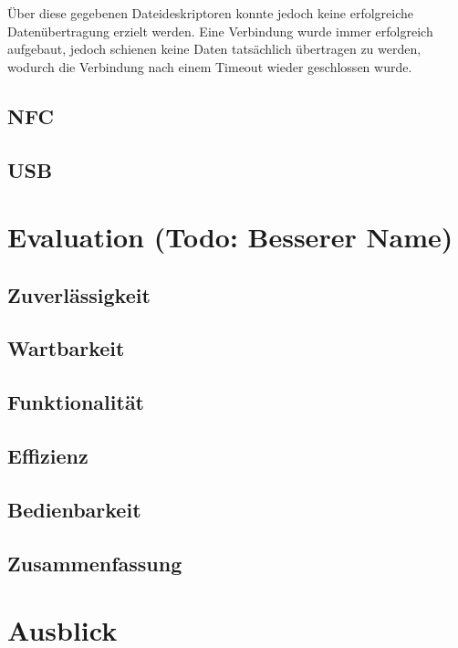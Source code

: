 \documentclass[12pt,a4paper]{article}
\begin{document}
        Über diese gegebenen Dateideskriptoren konnte jedoch keine erfolgreiche Datenübertragung erzielt werden. Eine Verbindung wurde immer erfolgreich aufgebaut, jedoch schienen keine Daten tatsächlich übertragen zu werden, wodurch die Verbindung nach einem Timeout wieder geschlossen wurde.
        
    \subsection{NFC}
		
		\subsection{USB}
		
		\section{Evaluation (Todo: Besserer Name)}
		
		\subsection{Zuverlässigkeit}
		
		\subsection{Wartbarkeit}
		
		\subsection{Funktionalität}
		
		\subsection{Effizienz}
		
		\subsection{Bedienbarkeit}
		
		\subsection{Zusammenfassung}
		
		\section{Ausblick}		
\end{document}
